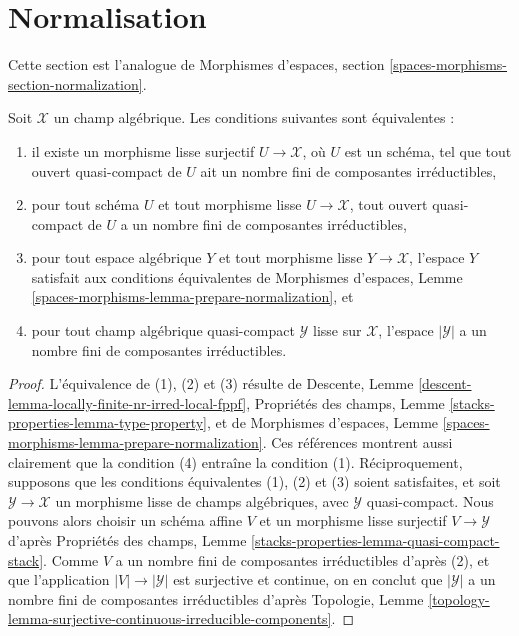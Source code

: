  
\section{Normalisation}
\label{section-normalization}

\noindent
Cette section est l'analogue de
Morphismes d'espaces, section \ref{spaces-morphisms-section-normalization}.

\begin{lemma}
\label{lemma-prepare-normalization}
Soit $\mathcal{X}$ un champ algébrique. Les conditions suivantes sont équivalentes :
\begin{enumerate}
\item il existe un morphisme lisse surjectif $U \to \mathcal{X}$, où $U$
est un schéma, tel que tout ouvert quasi-compact de $U$ ait
un nombre fini de composantes irréductibles,
\item pour tout schéma $U$ et tout morphisme lisse
$U \to \mathcal{X}$, tout ouvert quasi-compact de $U$ a un nombre fini de
composantes irréductibles,
\item pour tout espace algébrique $Y$ et tout morphisme lisse $Y \to \mathcal{X}$,
l'espace $Y$ satisfait aux conditions équivalentes de
Morphismes d'espaces, Lemme \ref{spaces-morphisms-lemma-prepare-normalization},
et
\item pour tout champ algébrique quasi-compact $\mathcal{Y}$ lisse sur
$\mathcal{X}$, l'espace $|\mathcal{Y}|$ a un nombre fini de composantes
irréductibles.
\end{enumerate}
\end{lemma}

\begin{proof}
L'équivalence de (1), (2) et (3) résulte de
Descente, Lemme \ref{descent-lemma-locally-finite-nr-irred-local-fppf},
Propriétés des champs, Lemme \ref{stacks-properties-lemma-type-property}, et de
Morphismes d'espaces, Lemme \ref{spaces-morphisms-lemma-prepare-normalization}.
Ces références montrent aussi clairement que la condition (4)
entraîne la condition (1). Réciproquement, supposons que les conditions équivalentes
(1), (2) et (3) soient satisfaites, et soit $\mathcal{Y} \to \mathcal{X}$ un
morphisme lisse de champs algébriques, avec $\mathcal{Y}$
quasi-compact. Nous pouvons alors choisir un schéma affine $V$ et un morphisme lisse
surjectif $V \to \mathcal{Y}$ d'après Propriétés des champs, Lemme
\ref{stacks-properties-lemma-quasi-compact-stack}.
Comme $V$ a un nombre fini de composantes irréductibles d'après (2), et que
l'application $|V| \to |\mathcal{Y}|$ est surjective et continue, on en conclut que
$|\mathcal{Y}|$ a un nombre fini de composantes irréductibles d'après Topologie, Lemme
\ref{topology-lemma-surjective-continuous-irreducible-components}.
\end{proof}

